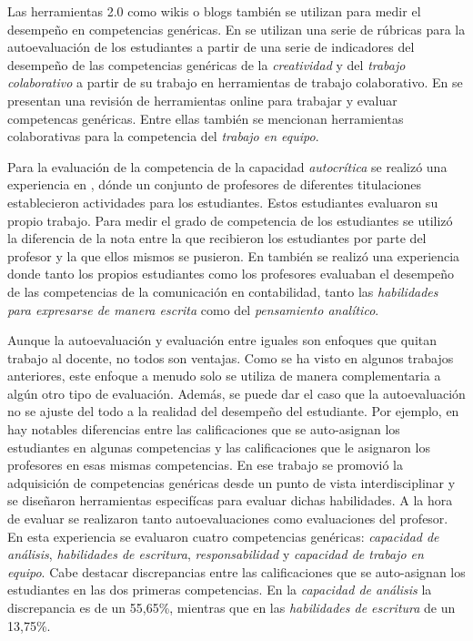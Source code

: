 Las herramientas 2.0 como wikis o blogs también se utilizan para medir el desempeño en competencias genéricas. En \cite{piedra2010measuring} se utilizan una serie de rúbricas para la autoevaluación de los estudiantes a partir de una serie de indicadores del desempeño de las competencias genéricas de la \emph{creatividad} y del \emph{trabajo colaborativo} a partir de su trabajo en herramientas de trabajo colaborativo. En \cite{mcloughlin2006beyond} se presentan una revisión de herramientas online para trabajar y evaluar competencas genéricas. Entre ellas también se mencionan herramientas colaborativas para la competencia del \emph{trabajo en equipo}.

Para la evaluación de la competencia de la capacidad \emph{autocrítica} se realizó una experiencia en \cite{pinto2011assessment}, dónde un conjunto de profesores de diferentes titulaciones establecieron actividades para los estudiantes. Estos estudiantes evaluaron su propio trabajo. Para medir el grado de competencia de los estudiantes se utilizó la diferencia de la nota entre la que recibieron los estudiantes por parte del profesor y la que ellos mismos se pusieron. En  \cite{sin2007evaluating} también se realizó una experiencia donde tanto los propios estudiantes como los profesores evaluaban el desempeño de las competencias de la comunicación en contabilidad, tanto las \emph{habilidades para expresarse de manera escrita} como del \emph{pensamiento analítico}.

Aunque la autoevaluación y evaluación entre iguales son enfoques que quitan trabajo al docente, no todos son ventajas. Como se ha visto en algunos trabajos anteriores, este enfoque a menudo solo se utiliza de manera complementaria a algún otro tipo de evaluación. Además, se puede dar el caso que la autoevaluación no se ajuste del todo a la realidad del desempeño del estudiante. Por ejemplo, en \cite{carreras2013promotion} hay notables diferencias entre las calificaciones que se auto-asignan los estudiantes en algunas competencias y las calificaciones que le asignaron los profesores en esas mismas competencias. En ese trabajo se promovió la adquisición de competencias genéricas desde un punto de vista interdisciplinar y se diseñaron herramientas especifícas para evaluar dichas habilidades. A la hora de evaluar se realizaron tanto autoevaluaciones como evaluaciones del profesor. En esta experiencia se evaluaron cuatro competencias genéricas: \emph{capacidad de análisis},  \emph{habilidades de escritura}, \emph{responsabilidad} y \emph{capacidad de trabajo en equipo}. Cabe destacar discrepancias entre las calificaciones que se auto-asignan los estudiantes en las dos primeras competencias. En la \emph{capacidad de análisis} la discrepancia es de un 55,65\%, mientras que en las \emph{habilidades de escritura} de un 13,75\%.

